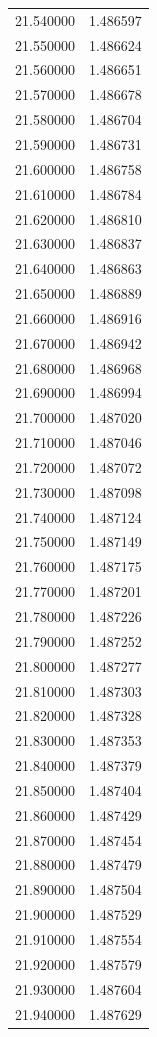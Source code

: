 \begin{tabular}{rr}
21.540000 & 1.486597 \\
21.550000 & 1.486624 \\
21.560000 & 1.486651 \\
21.570000 & 1.486678 \\
21.580000 & 1.486704 \\
21.590000 & 1.486731 \\
21.600000 & 1.486758 \\
21.610000 & 1.486784 \\
21.620000 & 1.486810 \\
21.630000 & 1.486837 \\
21.640000 & 1.486863 \\
21.650000 & 1.486889 \\
21.660000 & 1.486916 \\
21.670000 & 1.486942 \\
21.680000 & 1.486968 \\
21.690000 & 1.486994 \\
21.700000 & 1.487020 \\
21.710000 & 1.487046 \\
21.720000 & 1.487072 \\
21.730000 & 1.487098 \\
21.740000 & 1.487124 \\
21.750000 & 1.487149 \\
21.760000 & 1.487175 \\
21.770000 & 1.487201 \\
21.780000 & 1.487226 \\
21.790000 & 1.487252 \\
21.800000 & 1.487277 \\
21.810000 & 1.487303 \\
21.820000 & 1.487328 \\
21.830000 & 1.487353 \\
21.840000 & 1.487379 \\
21.850000 & 1.487404 \\
21.860000 & 1.487429 \\
21.870000 & 1.487454 \\
21.880000 & 1.487479 \\
21.890000 & 1.487504 \\
21.900000 & 1.487529 \\
21.910000 & 1.487554 \\
21.920000 & 1.487579 \\
21.930000 & 1.487604 \\
21.940000 & 1.487629 \\

\end{tabular}
